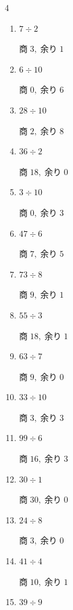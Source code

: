 \begin{multicols}{4}
\begin{enumerate}
\columnbreak %

\resetques

  \item $7 \div 2$

        $商\; 3,\; 余り\; 1$

  \item $6 \div 10$

        $商\; 0,\; 余り\; 6$

  \item $28 \div 10$

        $商\; 2,\; 余り\; 8$

  \item $36 \div 2$

        $商\; 18,\; 余り\; 0$

  \item $3 \div 10$

        $商\; 0,\; 余り\; 3$

  \item $47 \div 6$

        $商\; 7,\; 余り\; 5$

  \item $73 \div 8$

        $商\; 9,\; 余り\; 1$

  \item $55 \div 3$

        $商\; 18,\; 余り\; 1$

  \item $63 \div 7$

        $商\; 9,\; 余り\; 0$

  \item $33 \div 10$

        $商\; 3,\; 余り\; 3$

  \item $99 \div 6$

        $商\; 16,\; 余り\; 3$

  \item $30 \div 1$

        $商\; 30,\; 余り\; 0$

  \item $24 \div 8$

        $商\; 3,\; 余り\; 0$

  \item $41 \div 4$

        $商\; 10,\; 余り\; 1$

  \item $39 \div 9$


\end{enumerate}
\end{multicols}
